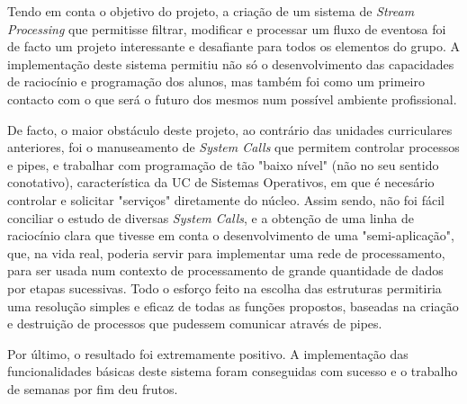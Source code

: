\documentclass[a4paper]{article}
\begin{document}
\hspace{3mm} Tendo em conta o objetivo do projeto, a criação de um sistema de \emph{Stream Processing} que permitisse filtrar, modificar e processar um fluxo de eventosa foi de facto um projeto interessante e desafiante para todos os elementos do grupo. A implementação deste sistema permitiu não só o desenvolvimento das capacidades de raciocínio e programação dos alunos, mas também foi como um primeiro contacto com o que será o futuro dos mesmos num possível ambiente profissional. 
\par De facto, o maior obstáculo deste projeto, ao contrário das unidades curriculares anteriores, foi o manuseamento de \emph{System Calls} que permitem controlar processos e pipes, e trabalhar com programação de tão "baixo nível" (não no seu sentido conotativo), característica da UC de Sistemas Operativos, em que é necesário controlar e solicitar "serviços" diretamente do núcleo. Assim sendo, não foi fácil conciliar o estudo de diversas \emph{System Calls}, e a obtenção de uma linha de raciocínio clara que tivesse em conta o desenvolvimento de uma "semi-aplicação", que, na vida real, poderia servir para implementar uma rede de processamento, para ser usada  num contexto de processamento de grande quantidade de dados por etapas sucessivas. Todo o esforço feito na escolha das estruturas permitiria uma resolução simples e eficaz de todas as funções propostos, baseadas na criação e destruição de processos que pudessem comunicar através de pipes.
\par Por último, o resultado foi extremamente positivo. A implementação das funcionalidades básicas deste sistema foram conseguidas com sucesso e o trabalho de semanas por fim deu frutos.
\end{document}
